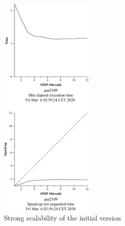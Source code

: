 \begin{figure}[H]%
    \centering
    \includegraphics[width=0.4\textwidth]{./data/3dfft_/3dfft_omp-strong-1.pdf}
    \caption{Strong scalability of the initial version}%
    \label{fig:omp1-plot}
\end{figure}

